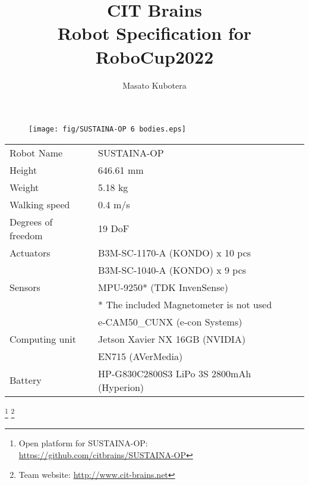 \documentclass[runningheads]{llncs}
\begin{document}
\title{CIT Brains\\Robot Specification for RoboCup2022}
\author{Masato Kubotera}


\maketitle

\begin{figure}
  \centering
  \texttt{[image: fig/SUSTAINA-OP 6 bodies.eps]}
  \end{figure}

\begin{table}[]
  \centering
  \begin{tabular}{ll}
    \hline
    Robot Name          & SUSTAINA-OP\\
    Height              & 646.61 mm\\
    Weight              & 5.18 kg\\
    Walking speed       & 0.4 m/s\\
    Degrees of freedom  & 19 DoF\\
    Actuators           & B3M-SC-1170-A (KONDO) x 10 pcs\\
                        & B3M-SC-1040-A (KONDO) x 9 pcs\\
    Sensors             & MPU-9250* (TDK InvenSense)\\
                        & \quad \tiny{* The included Magnetometer is not used}\\
                        & e-CAM50\_CUNX (e-con Systems)\\
    Computing unit      & Jetson Xavier NX 16GB (NVIDIA)\\
                        & EN715 (AVerMedia)\\                        
    Battery             & HP-G830C2800S3 LiPo 3S 2800mAh (Hyperion)\\
    \hline
  \end{tabular}
\end{table}

\renewcommand{\thefootnote}{\fnsymbol{footnote}}

\footnote[0]{Open platform for SUSTAINA-OP: \url{https://github.com/citbrains/SUSTAINA-OP}}
\footnote[0]{Team website: \url{http://www.cit-brains.net}}
\end{document}
